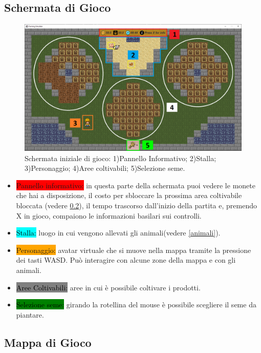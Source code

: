 \documentclass[a4paper,12pt]{report}
\begin{document}
\subsection{Schermata di Gioco}
\begin{figure}[!htb]
	\centerline{\includegraphics[width=\textwidth]{img/SchermataPrincipale.png}}
	\caption{Schermata iniziale di gioco: 1)Pannello Informativo; 2)Stalla; 3)Personaggio; 4)Aree coltivabili; 5)Selezione seme. }
	\label{img:schermata}
\end{figure}
\begin{itemize}
	\item[1)] \colorbox{red}{Pannello informativo:} in questa parte della schermata puoi vedere le monete che hai a disposizione, il costo per sbloccare la prossima area coltivabile bloccata (vedere \cref{mappa}), il tempo trascorso dall'inizio della partita e, premendo X in gioco, compaiono le informazioni basilari sui controlli.
	\item[2)] \colorbox{cyan}{\textcolor{black}{Stalla:}} luogo in cui vengono allevati gli animali(vedere \cref{animali}).
	\item[3)] \colorbox{orange}{Personaggio:} avatar virtuale che si muove nella mappa tramite la pressione dei tasti WASD.
	Può interagire con alcune zone della mappa e con gli animali.
	\item[4)] \colorbox{gray}{\textcolor{black}{Aree Coltivabili:}} aree in cui è possibile coltivare i prodotti.
	\item[5)] \colorbox{green}{\textcolor{black}{Selezione seme:}} girando la rotellina del mouse è possibile scegliere il seme da piantare.
\end{itemize}
\subsection{Mappa di Gioco}
		\label{mappa}
	
\end{document}
